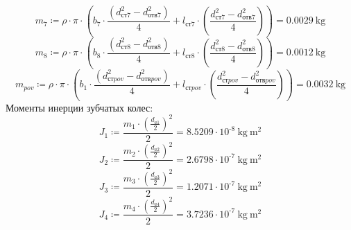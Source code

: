 \documentclass{article}
\newcommand{\defeq}{\coloneq} %
\begin{document}
\begin{equation*}
\textit{m}_{\textit{7}} \defeq {\rho} \cdot {\pi} \cdot \left( \textit{b}_{\textit{7}} \cdot \frac{\left( \textit{d}_{\textit{ст7}}^{2}-\textit{d}_{\textit{отв7}}^{2} \right)}{4}+\textit{l}_{\textit{ст7}} \cdot \left( \frac{\textit{d}_{\textit{ст7}}^{2}-\textit{d}_{\textit{отв7}}^{2}}{4} \right) \right) = {0.0029 \: \mathrm{kg}}
\end{equation*}
\begin{equation*}
\textit{m}_{\textit{8}} \defeq {\rho} \cdot {\pi} \cdot \left( \textit{b}_{\textit{8}} \cdot \frac{\left( \textit{d}_{\textit{ст8}}^{2}-\textit{d}_{\textit{отв8}}^{2} \right)}{4}+\textit{l}_{\textit{ст8}} \cdot \left( \frac{\textit{d}_{\textit{ст8}}^{2}-\textit{d}_{\textit{отв8}}^{2}}{4} \right) \right) = {0.0012 \: \mathrm{kg}}
\end{equation*}
\begin{equation*}
m_{pov} \defeq {\rho} \cdot {\pi} \cdot \left( \textit{b}_{\textit{1}} \cdot \frac{\left( d_{стpov}^{2}-d_{отвpov}^{2} \right)}{4}+l_{стpov} \cdot \left( \frac{d_{стpov}^{2}-d_{отвpov}^{2}}{4} \right) \right) = {0.0032 \: \mathrm{kg}}
\end{equation*}
\colorbox[HTML]{000000}{Моменты инерции зубчатых колес:}\newline
\begin{equation*}
\textit{J}_{\textit{1}} \defeq \frac{\textit{m}_{\textit{1}} \cdot \left( \frac{\textit{d}_{\textit{a1}}}{2} \right)^{2}}{2} = {8.5209 \cdot 10^{ \operatorname{-} 8} \: \mathrm{kg} \: \mathrm{m}^{2}}
\end{equation*}
\begin{equation*}
\textit{J}_{\textit{2}} \defeq \frac{\textit{m}_{\textit{2}} \cdot \left( \frac{\textit{d}_{\textit{a2}}}{2} \right)^{2}}{2} = {2.6798 \cdot 10^{ \operatorname{-} 7} \: \mathrm{kg} \: \mathrm{m}^{2}}
\end{equation*}
\begin{equation*}
\textit{J}_{\textit{3}} \defeq \frac{\textit{m}_{\textit{3}} \cdot \left( \frac{\textit{d}_{\textit{a3}}}{2} \right)^{2}}{2} = {1.2071 \cdot 10^{ \operatorname{-} 7} \: \mathrm{kg} \: \mathrm{m}^{2}}
\end{equation*}
\begin{equation*}
\textit{J}_{\textit{4}} \defeq \frac{\textit{m}_{\textit{4}} \cdot \left( \frac{\textit{d}_{\textit{a4}}}{2} \right)^{2}}{2} = {3.7236 \cdot 10^{ \operatorname{-} 7} \: \mathrm{kg} \: \mathrm{m}^{2}}
\end{equation*}
\end{document}
